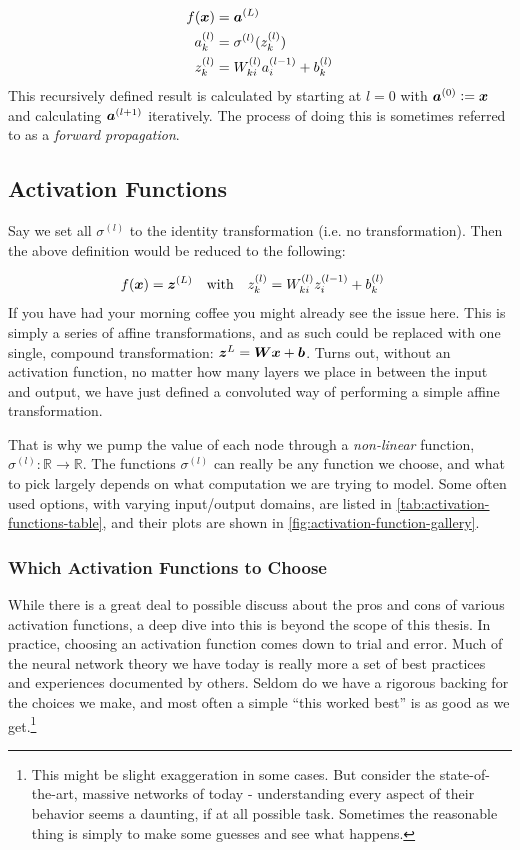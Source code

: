\documentclass[Thesis.tex]{subfiles}
\begin{document}
 \begin{align}
   f(\bm{x}) &= \bm{a}^{(L)}\\
   a_k^{(l)} &= \sigma^{(l)}(z_k^{(l)})\\
   z_k^{(l)} &= W^{(l)}_{ki}a_i^{(l-1)} + b^{(l)}_k
 \end{align}
This recursively defined result is calculated by starting at $l=0$ with
$\bm{a}^{(0)}\vcentcolon= \bm{x}$ and calculating $\bm{a}^{(l+1)}$ iteratively. The
process of doing this is sometimes referred to as a \emph{forward propagation}.


\subsection{Activation Functions}

Say we set all $\sigma^{(l)}$ to the identity transformation (i.e. no
transformation). Then the above definition would be reduced to the following:

\begin{align}
  f(\vx) = \vb{z}^{(L)}\qq{with}
   z_k^{(l)} &= W^{(l)}_{ki}z_i^{(l-1)} + b^{(l)}_k
\end{align}
If you have had your morning coffee you might already see the issue here. This
is simply a series of affine transformations, and as such could be replaced with
one single, compound transformation: $\bm{z}^{L} = \bm{W}\bm{x} + \bm{b}$. Turns
out, without an activation function, no matter how many layers we place in
between the input and output, we have just defined a convoluted way of
performing a simple affine transformation.

That is why we pump the value of each
node through a \emph{non-linear} function, $\sigma^{(l)}: \mathbb{R}\to\mathbb{R}$.
The functions $\sigma^{(l)}$ can really be any function we choose, and what to
pick largely depends on what computation we are trying to model. Some often used
options, with varying input/output domains, are listed in
\cref{tab:activation-functions-table}, and their plots are shown in
\cref{fig:activation-function-gallery}.

\subsubsection{Which Activation Functions to Choose}

While there is a great deal to possible discuss about the pros and cons of various
activation functions, a deep dive into this is beyond the scope of this
thesis. In practice, choosing an activation function comes down to trial
and error. Much of the neural network theory we have today is really more a set
of best practices and experiences documented by others. Seldom do we have a
rigorous backing for the choices we make, and most often a simple ``this worked
best'' is as good as we get.\footnote{This might be slight exaggeration in some
cases. But consider the state-of-the-art, massive networks of today -
understanding every aspect of their behavior seems a daunting, if at all
possible task. Sometimes the reasonable thing is simply to make some guesses and
see what happens.}
\end{document}
